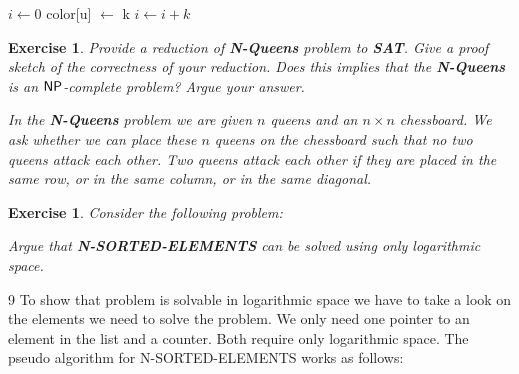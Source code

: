 \documentclass [11pt]{article}
\newtheorem{exercise}[theorem]{Exercise}
\newcommand{\ccfont}[1]{\protect\mathsf{#1}}
\newcommand{\NP}{\ccfont{NP}}
\newcommand{\solution}[1]{\noindent {\bf Solution.}  #1}
\begin{document}
\begin{algorithmic}
    \State $i\gets 0$
    color[u] $\gets$ k
        \State $i\gets i+k$
    \EndIf
\EndFor
\EndFunction
\end{algorithmic}


\begin{exercise}
  \label{ex:Nqueens}
  Provide a reduction of \textbf{N-Queens} problem to \textbf{SAT}. Give a proof sketch of the correctness of your reduction. Does this implies that the \textbf{N-Queens} is an $\NP$-complete problem? Argue your answer.  
  
  \smallskip 
  
\noindent In the \textbf{N-Queens} problem we are given $n$ queens and an $n \times n$ chessboard. We ask whether we can place these $n$ queens on the  chessboard such that no two queens attack each other. Two queens attack each other if they are placed in the same row, or in the same column, or in the same diagonal.    
       
   
\end{exercise}




\begin{exercise}
  Consider the following problem:
  \begin{center}
  \end{center}

  \medskip Argue that \textbf{N-SORTED-ELEMENTS} can be solved using only logarithmic
  space.
\end{exercise}


\solution{ 9}
To show that problem is solvable in logarithmic space we have to take a look on the elements we need to solve the problem. We only need one pointer to an element in the list and a counter. Both require only logarithmic space. The pseudo algorithm  for
N-SORTED-ELEMENTS works as follows:
\end{document}
